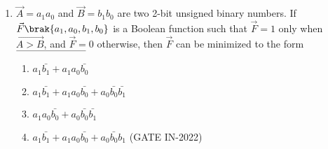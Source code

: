 %
\begin{enumerate}
\item $\vec{A}=a_1a_0$ and $\vec{B}=b_1b_0$ are two 2-bit unsigned binary numbers. If $\vec{F}\brak{a_1,a_0,b_1,b_0}$ is a Boolean function such that $\vec{F} = 1$ only when $\vec{A > B}$, and $\vec{F} = 0$ otherwise, then $\vec{F}$ can be minimized to the form $\rule{2.5cm}{0.10mm}$
\begin{enumerate}
\item $a_1\bar{b_1}+a_1a_0\bar{b_0}$
\item $a_1\bar{b_1}+a_1a_0\bar{b_0}+a_0\bar{b_0}\bar{b_1}$
\item $a_1a_0\bar{b_0}+a_0\bar{b_0}\bar{b_1}$
\item $a_1\bar{b_1}+a_1a_0\bar{b_0}+a_0\bar{b_0}b_1$
\hfill(GATE IN-2022)
\end{enumerate}    
\end{enumerate}
%
